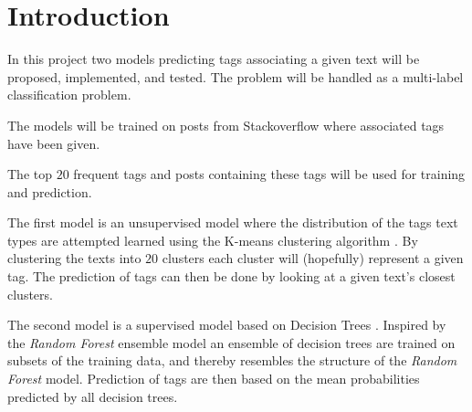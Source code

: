 
\section{Introduction}

In this project two models predicting tags associating a given text will be
proposed, implemented, and tested. The problem will be handled as a
multi-label classification problem.

The models will be trained on posts from Stackoverflow where associated
tags have been given.

The top $20$ frequent tags and posts containing these tags will be used for
training and prediction.


The first model is an unsupervised model where the distribution of the tags
text types are attempted learned using the K-means clustering algorithm
\cite{numerical-optimization}. By clustering the texts into $20$ clusters each
cluster will (hopefully) represent a given tag. The prediction of tags can
then be done by looking at a given text's closest clusters.


The second model is a supervised model based on Decision Trees
\cite{numerical-optimization}. Inspired by the \textit{Random Forest} ensemble
model an ensemble of decision trees are trained on subsets of the training data,
and thereby resembles the structure of the \textit{Random Forest} model.
Prediction of tags are then based on the mean probabilities predicted by all
decision trees.
